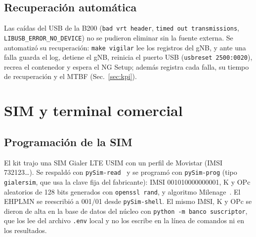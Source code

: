 \documentclass[conference]{IEEEtran}
\begin{document}
\subsection{Recuperación automática}
Las caídas del USB de la B200 (\texttt{bad vrt header}, \texttt{timed out transmissions}, \texttt{LIBUSB\_ERROR\_NO\_DEVICE}) no se pudieron eliminar sin la fuente externa. Se automatizó su recuperación: \texttt{make vigilar} lee los registros del gNB, y ante una falla guarda el log, detiene el gNB, reinicia el puerto USB (\texttt{usbreset 2500:0020}), recrea el contenedor y espera el NG Setup; además registra cada falla, su tiempo de recuperación y el MTBF (Sec.~\ref{sec:kpi}).

\section{SIM y terminal comercial}
\label{sec:ue}

\subsection{Programación de la SIM}
El kit trajo una SIM Gialer LTE USIM con un perfil de Movistar (IMSI 732123\ldots). Se respaldó con \texttt{pySim-read}~\cite{pysim} y se programó con \texttt{pySim-prog} (tipo \texttt{gialersim}, que usa la clave fija del fabricante): IMSI 001010000000001, K y OPc aleatorios de 128 bits generados con \texttt{openssl rand}, y algoritmo Milenage~\cite{milenage}. El EHPLMN se reescribió a 001/01 desde \texttt{pySim-shell}. El mismo IMSI, K y OPc se dieron de alta en la base de datos del núcleo con \texttt{python -m banco suscriptor}, que los lee del archivo \texttt{.env} local y no los escribe en la línea de comandos ni en los resultados.
\end{document}

